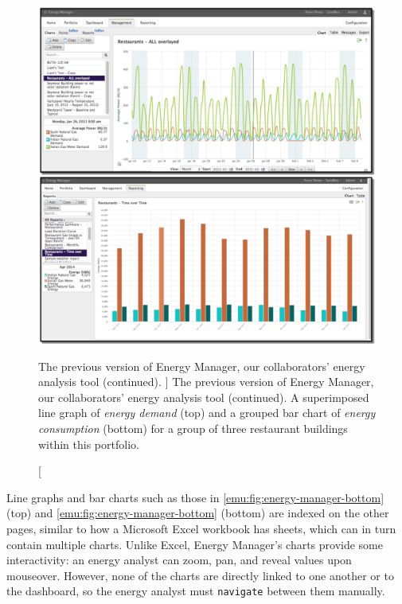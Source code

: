 \begin{figure}
	\centering
	\includegraphics[width=\textwidth]{figures/em-bottom.pdf}
	\caption
	[
	    The previous version of Energy Manager, our collaborators' energy analysis tool (continued).
	]
	{
	    The previous version of Energy Manager, our collaborators' energy analysis tool (continued). A superimposed line graph of \textsl{energy demand} (top) and a grouped bar chart of \textsl{energy consumption} (bottom) for a group of three restaurant buildings within this portfolio.
	}
	\centering
	\label{emu:fig:energy-manager-bottom}
\end{figure} 


Line graphs and bar charts such as those in \autoref{emu:fig:energy-manager-bottom} (top) and \autoref{emu:fig:energy-manager-bottom} (bottom) are indexed on the other pages, similar to how a Microsoft Excel workbook has sheets, which can in turn contain multiple charts. 
Unlike Excel, Energy Manager's charts provide some interactivity: an energy analyst can zoom, pan, and reveal values upon mouseover. 
However, none of the charts are directly linked to one another or to the dashboard, so the energy analyst must {\tt navigate} between them manually.

